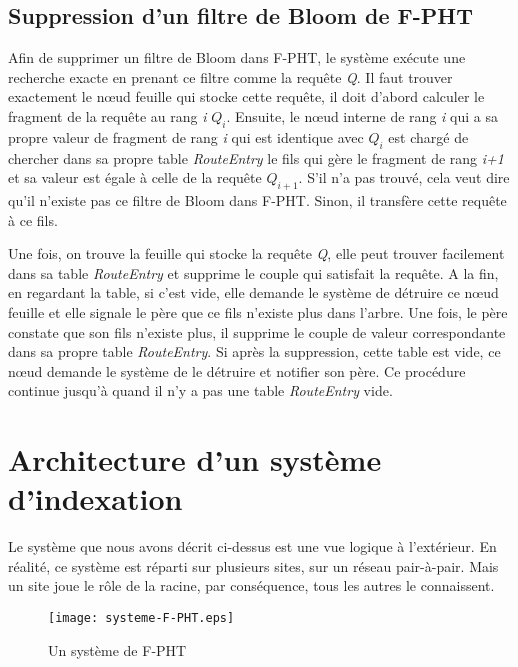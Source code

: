 \documentclass[a4paper,11pt]{report}
\begin{document}
\section{Suppression d'un filtre de Bloom de F-PHT}
	Afin de supprimer un filtre de Bloom dans F-PHT, le système exécute une recherche exacte en prenant ce filtre comme la requête \textit{Q}. Il faut trouver exactement le nœud feuille qui stocke cette requête, il doit d'abord calculer le fragment de la requête au rang \textit{i} \textit{$Q_i$}. Ensuite, le nœud interne de rang \textit{i} qui a sa propre valeur de fragment de rang \textit{i} qui est identique avec \textit{$Q_i$} est chargé de chercher dans sa propre table \textit{RouteEntry} le fils qui gère le fragment de rang \textit{i+1} et sa valeur est égale à celle de la requête \textit{$Q_{i+1}$}. S'il n'a pas trouvé, cela veut dire qu'il n'existe pas ce filtre de Bloom dans F-PHT. Sinon, il transfère cette requête à ce fils.
	
	Une fois, on trouve la feuille qui stocke la requête \textit{Q}, elle peut trouver facilement dans sa table \textit{RouteEntry} et supprime le couple qui satisfait la requête. A la fin, en regardant la table, si c'est vide, elle demande le système de détruire ce nœud feuille et elle signale le père que ce fils n'existe plus dans l'arbre. Une fois, le père constate que son fils n'existe plus, il supprime le couple de valeur correspondante dans sa propre table \textit{RouteEntry}. Si après la suppression, cette table est vide, ce nœud demande le système de le détruire et notifier son père. Ce procédure continue jusqu'à quand il n'y a pas une table \textit{RouteEntry} vide.
	
\chapter{Architecture d'un système d'indexation}

	Le système que nous avons décrit ci-dessus est une vue logique à l'extérieur. En réalité, ce système est réparti sur plusieurs sites, sur un réseau pair-à-pair. Mais un site joue le rôle de la racine, par conséquence, tous les autres le connaissent.
	
	\begin{figure}[!htbp]
	\centering
	\texttt{[image: systeme-F-PHT.eps]}
	\caption{Un système de F-PHT}
	\label{systemeF-PHT}
	\end{figure}	
	
	
\end{document}
